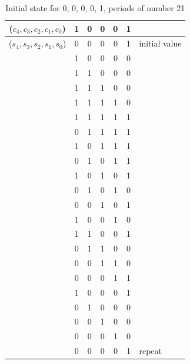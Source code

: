 \documentclass[a4paper, 11pt]{article}
\begin{document}
  
\begin{table}[htbp]
    \centering
    \caption{Initial state for 0, 0, 0, 0, 1, periods of number 21}
      \begin{tabular}{ccccccl}
      \hline
      ($c_{4}, c_{3}, c_{2}, c_{1}, c_{0} $) & 1     & 0     & 0     & 0     & 1     &  \bigstrut\\
      \hline
      ($s_{4}, s_{3}, s_{2}, s_{1}, s_{0} $) & 0     & 0     & 0     & 0     & 1     & initial value \bigstrut\\
      \hline
      \multirow{21}[42]{*}{} & 1     & 0     & 0     & 0     & 0     & \multirow{20}[40]{*}{} \bigstrut\\
  \cline{2-6}          & 1     & 1     & 0     & 0     & 0     &  \bigstrut\\
  \cline{2-6}          & 1     & 1     & 1     & 0     & 0     &  \bigstrut\\
  \cline{2-6}          & 1     & 1     & 1     & 1     & 0     &  \bigstrut\\
  \cline{2-6}          & 1     & 1     & 1     & 1     & 1     &  \bigstrut\\
  \cline{2-6}          & 0     & 1     & 1     & 1     & 1     &  \bigstrut\\
  \cline{2-6}          & 1     & 0     & 1     & 1     & 1     &  \bigstrut\\
  \cline{2-6}          & 0     & 1     & 0     & 1     & 1     &  \bigstrut\\
  \cline{2-6}          & 1     & 0     & 1     & 0     & 1     &  \bigstrut\\
  \cline{2-6}          & 0     & 1     & 0     & 1     & 0     &  \bigstrut\\
  \cline{2-6}          & 0     & 0     & 1     & 0     & 1     &  \bigstrut\\
  \cline{2-6}          & 1     & 0     & 0     & 1     & 0     &  \bigstrut\\
  \cline{2-6}          & 1     & 1     & 0     & 0     & 1     &  \bigstrut\\
  \cline{2-6}          & 0     & 1     & 1     & 0     & 0     &  \bigstrut\\
  \cline{2-6}          & 0     & 0     & 1     & 1     & 0     &  \bigstrut\\
  \cline{2-6}          & 0     & 0     & 0     & 1     & 1     &  \bigstrut\\
  \cline{2-6}          & 1     & 0     & 0     & 0     & 1     &  \bigstrut\\
  \cline{2-6}          & 0     & 1     & 0     & 0     & 0     &  \bigstrut\\
  \cline{2-6}          & 0     & 0     & 1     & 0     & 0     &  \bigstrut\\
  \cline{2-6}          & 0     & 0     & 0     & 1     & 0     &  \bigstrut\\
  \cline{2-7}          & 0     & 0     & 0     & 0     & 1     & repeat \bigstrut\\
  \cline{2-7}    \end{tabular}%
    \label{tab:Table 1}%
  \end{table}%
\end{document}
